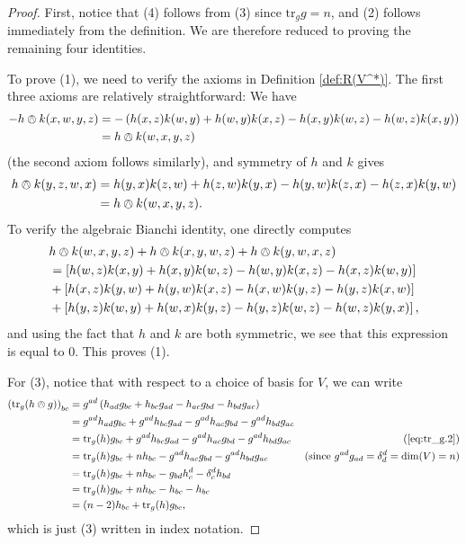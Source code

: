 \documentclass{amsart}
\numberwithin{equation}{section}
\newcommand{\tr}{\mathrm{tr}}
\theoremstyle{plain}
\theoremstyle{definition}
\theoremstyle{remark}
\begin{document}
\begin{proof}
    First, notice that (4) follows from (3) since $\tr_g g = n$, and (2) follows immediately from the definition. We are therefore reduced to proving the remaining four identities. 

    To prove (1), we need to verify the axioms in Definition \ref{def:R(V^*)}. The first three axioms are relatively straightforward: We have
    \begin{align*}
    -h \owedge k(x,w,y,z) &= - \left(h(x,z)k(w,y) + h(w,y)k(x,z) - h(x,y)k(w,z) - h(w,z)k(x,y)\right)\\
     &= h \owedge k(w,x,y,z)
    \end{align*}
    (the second axiom follows similarly), and symmetry of $h$ and $k$ gives
    \begin{align*}
        h \owedge k(y,z,w,x) &= h(y,x)k(z,w) + h(z,w)k(y,x) - h(y,w)k(z,x) - h(z,x)k(y,w) \\
        &= h \owedge k(w,x,y,z).
    \end{align*}
    To verify the algebraic Bianchi identity, one directly computes
    \begin{align*}
    &h \owedge k(w,x,y,z) + h \owedge k(x,y,w,z) + h \owedge k(y,w,x,z) \\ 
    &= \left[h(w,z)k(x,y) + h(x, y)k(w,z) - h(w,y)k(x,z) - h(x,z)k(w,y)\right] \\
    &+ \left[h(x,z)k(y,w) + h(y,w) k(x,z) - h(x,w)k(y,z) - h(y,z)k(x,w)\right] \\
    &+ \left[h(y,z)k(w,y) + h(w,x)k(y,z) - h(y,z)k(w,z) - h(w,z) k(y,x)\right],
    \end{align*}
    and using the fact that $h$ and $k$ are both symmetric, we see that this expression is equal to $0$. This proves (1).

    For (3), notice that with respect to a choice of basis for $V$, we can write 
    \begin{align*}
        \left(\tr_g(h \owedge g)\right)_{bc} &= g^{ad}\left(h_{ad}g_{bc} + h_{bc}g_{ad} - h_{ac}g_{bd} - h_{bd}g_{ac}\right) \\ 
        &= g^{ad}h_{ad}g_{bc} + g^{ad}h_{bc}g_{ad} - g^{ad}h_{ac}g_{bd} - g^{ad}h_{bd}g_{ac}\\
        &= \tr_g(h)g_{bc} + g^{ad}h_{bc}g_{ad} - g^{ad}h_{ac}g_{bd} - g^{ad}h_{bd}g_{ac} &  (\ref{eq:tr_g.2})\\ 
        &=  \tr_g(h)g_{bc} + n h_{bc} - g^{ad}h_{ac}g_{bd} - g^{ad}h_{bd}g_{ac} &  (\text{since } g^{ad}g_{ad} = \delta_d^d = \dim(V) = n)\\ 
        &= \tr_g(h)g_{bc} + n h_{bc} - g_{bd}h^d_c - \delta_c^d h_{bd}\\
        &= \tr_g(h)g_{bc} + n h_{bc} - h_{bc} - h_{bc} \\
        &= (n-2)h_{bc} + \tr_g(h)g_{bc},
    \end{align*}
    which is just (3) written in index notation.


\end{proof}
\end{document}
